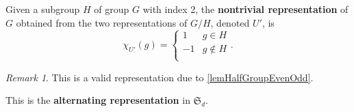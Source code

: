 \documentclass[12pt, letterpaper]{article}
\theoremstyle{definition}
\theoremstyle{remark}
\newtheorem*{rem*}{Remark}
\theoremstyle{definition}
\theoremstyle{plain}
\numberwithin{equation}{section}
\begin{document}
	\begin{def*}
		Given a subgroup $H$ of group $G$ with index 2,
		the \textbf{nontrivial representation} of $G$ obtained 
		from the two representations of $G/H$, denoted $U'$, is
		\[\chi_{U'}(g)=\begin{cases}
			1&g\in H\\
			-1&g\notin H\\
		\end{cases}. \]
	\end{def*}
	\begin{rem*}
		This is a valid representation due to \autoref{lemHalfGroupEvenOdd}.
		
		This is the \textbf{alternating representation} in $\mathfrak{S}_d$.
	\end{rem*}
\end{document}
